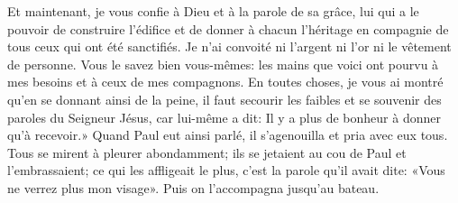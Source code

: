 Et maintenant, je vous confie à Dieu et à la parole de sa grâce,
	lui qui a le pouvoir de construire l’édifice
	et de donner à chacun l’héritage en compagnie de tous ceux qui ont été sanctifiés.
Je n’ai convoité ni l’argent ni l’or ni le vêtement de personne.
Vous le savez bien vous-mêmes:
	les mains que voici ont pourvu à mes besoins et à ceux de mes compagnons.
En toutes choses, je vous ai montré
	qu’en se donnant ainsi de la peine, il faut secourir les faibles
	et se souvenir des paroles du Seigneur Jésus,
	car lui-même a dit: Il y a plus de bonheur à donner qu’à recevoir.»
Quand Paul eut ainsi parlé, il s’agenouilla et pria avec eux tous.
Tous se mirent à pleurer abondamment;
	ils se jetaient au cou de Paul et l’embrassaient;
	ce qui les affligeait le plus, c’est la parole qu’il avait dite:
	«Vous ne verrez plus mon visage».
Puis on l’accompagna jusqu’au bateau.
